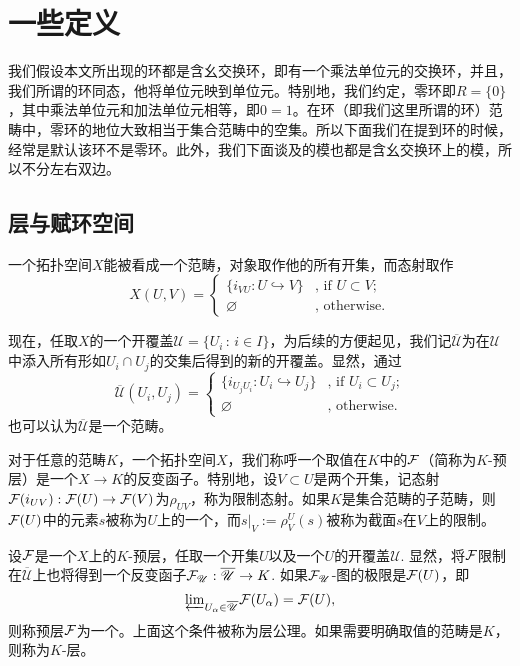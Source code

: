
\chapter{一些定义}

我们假设本文所出现的环都是含幺交换环，即有一个乘法单位元的交换环，并且，我们所谓的环同态，他将单位元映到单位元。特别地，我们约定，零环即$R=\{0\}$，其中乘法单位元和加法单位元相等，即$0=1$。在环（即我们这里所谓的环）范畴中，零环的地位大致相当于集合范畴中的空集。所以下面我们在提到环的时候，经常是默认该环不是零环。此外，我们下面谈及的模也都是含幺交换环上的模，所以不分左右双边。

\section{层与赋环空间}

\begin{para}
一个拓扑空间$X$能被看成一个范畴，对象取作他的所有开集，而态射取作
\[
	X(U,V)=\begin{cases}
	\bigl\{i_{VU}:U\hookrightarrow V\bigr\}&\text{, if }U\subset V\text{;}\\
	\varnothing&\text{, otherwise}.
	\end{cases}
\]

现在，任取$X$的一个开覆盖$\mathscr{U}=\{U_i\,:\, i\in I\}$，为后续的方便起见，我们记$\overline{\mathscr{U}}$为在$\mathscr{U}$中添入所有形如$U_i\cap U_j$的交集后得到的新的开覆盖。显然，通过
\[
	\overline{\mathscr{U}}(U_i,U_j)=\begin{cases}
	\bigl\{i_{U_jU_i}:U_i\hookrightarrow U_j\bigr\}&\text{, if }U_i\subset U_j\text{;}\\
	\varnothing&\text{, otherwise}.
	\end{cases}
\]
也可以认为$\overline{\mathscr{U}}$是一个范畴。
\end{para}

\begin{para}
对于任意的范畴$K$，一个拓扑空间$X$，我们称呼一个取值在$K$中的$\mathcal{F}$（简称为$K$-预层）是一个$X\to K$的反变函子。特别地，设$V\subset U$是两个开集，记态射$\mathcal{F}(i_{UV}):\mathcal{F}(U)\to \mathcal{F}(V)$为$\rho_{UV}$，称为限制态射。如果$K$是集合范畴的子范畴，则$\mathcal{F}(U)$中的元素$s$被称为$U$上的一个，而$s|_V:=\rho^U_V(s)$被称为截面$s$在$V$上的限制。

设$\mathcal{F}$是一个$X$上的$K$-预层，任取一个开集$U$以及一个$U$的开覆盖$\mathscr{U}$. 显然，将$\mathcal{F}$限制在$\overline{\mathscr{U}}$上也将得到一个反变函子$\mathcal{F}_\mathscr{U}:\overline{\mathscr{U}}\to K$. 如果$\mathcal{F}_\mathscr{U}$-图的极限是$\mathcal{F}(U)$，即
\[
	{\varprojlim}_{U_\alpha\in \overline{\mathscr{U}}}\mathcal{F}(U_\alpha)=\mathcal{F}(U),
\]
则称预层$\mathcal{F}$为一个。上面这个条件被称为层公理。如果需要明确取值的范畴是$K$，则称为$K$-层。
\end{para}

